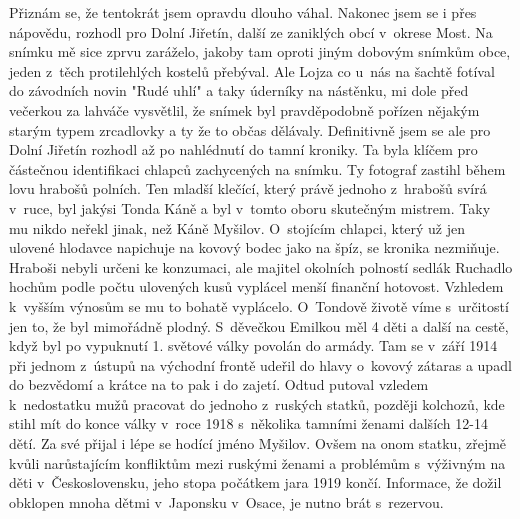 
Přiznám se, že tentokrát jsem opravdu dlouho váhal. Nakonec jsem se i
přes nápovědu, rozhodl pro Dolní Jiřetín, další ze zaniklých obcí
v~okrese Most. Na snímku mě sice zprvu zaráželo, jakoby tam oproti jiným
dobovým snímkům obce, jeden z~těch protilehlých kostelů přebýval. Ale
Lojza co u~nás na šachtě fotíval do závodních novin "Rudé uhlí" a taky
úderníky na nástěnku, mi dole před večerkou za lahváče vysvětlil, že
snímek byl pravděpodobně pořízen nějakým starým typem zrcadlovky a ty
že to občas dělávaly. Definitivně jsem se ale pro Dolní Jiřetín
rozhodl až po nahlédnutí do tamní kroniky. Ta byla klíčem pro
částečnou identifikaci chlapců zachycených na snímku. Ty fotograf
zastihl během lovu hrabošů polních. Ten mladší klečící, který právě
jednoho z~hrabošů svírá v~ruce, byl jakýsi Tonda Káně a byl v~tomto
oboru skutečným mistrem. Taky mu nikdo neřekl jinak, než Káně Myšilov.
O~stojícím chlapci, který už jen ulovené hlodavce napichuje na kovový
bodec jako na špíz, se kronika nezmiňuje. Hraboši nebyli určeni ke
konzumaci, ale majitel okolních polností sedlák Ruchadlo hochům podle
počtu ulovených kusů vyplácel menší finanční hotovost. Vzhledem
k~vyšším výnosům se mu to bohatě vyplácelo. O~Tondově životě víme
s~určitostí jen to, že byl mimořádně plodný. S~děvečkou Emilkou měl 4
děti a další na cestě, když byl po vypuknutí 1. světové války povolán
do armády. Tam se v~září 1914 při jednom z~ústupů na východní frontě
    udeřil do hlavy o~kovový zátaras a upadl do bezvědomí a krátce na
    to pak i do zajetí. Odtud putoval vzledem k~nedostatku mužů
    pracovat do jednoho z~ruských statků, později kolchozů, kde stihl
    mít do konce války v~roce 1918 s~několika tamními ženami dalších
    12-14 dětí. Za své přijal i lépe se hodící jméno Myšilov. Ovšem na
    onom statku, zřejmě kvůli narůstajícím konfliktům mezi ruskými
    ženami a problémům s~výživným na děti v~Československu, jeho stopa
    počátkem jara 1919 končí. Informace, že dožil obklopen mnoha dětmi
    v~Japonsku v~Osace, je nutno brát s~rezervou.

